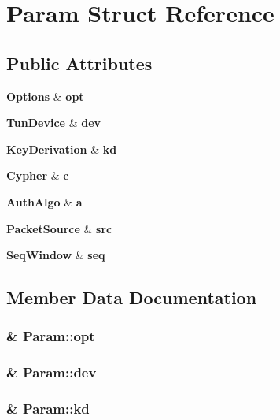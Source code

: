 \section{Param Struct Reference}
\label{structParam}
\subsection*{Public Attributes}
\begin{CompactItemize}
\item 
{\bf Options} \& {\bf opt}
\item 
{\bf Tun\-Device} \& {\bf dev}
\item 
{\bf Key\-Derivation} \& {\bf kd}
\item 
{\bf Cypher} \& {\bf c}
\item 
{\bf Auth\-Algo} \& {\bf a}
\item 
{\bf Packet\-Source} \& {\bf src}
\item 
{\bf Seq\-Window} \& {\bf seq}
\end{CompactItemize}


\subsection{Member Data Documentation}
\subsubsection{\& {\bf Param::opt}}\label{structParam_f690604eb7652c5f5407815c5022b46c}


\subsubsection{\& {\bf Param::dev}}\label{structParam_1fa9d0f89264543bbad03a9e4e0c5f44}


\subsubsection{\& {\bf Param::kd}}\label{structParam_6cfe55741cae1cf1bdde27561f292d8a}


